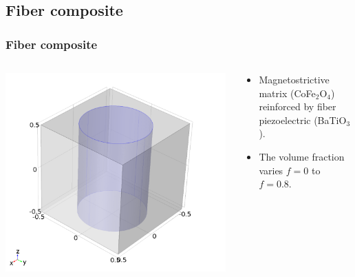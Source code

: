 \documentclass[compress]{beamer}
\begin{document}
\subsection{Fiber composite}
\begin{frame}\frametitle{Fiber composite}
\begin{columns}[totalwidth=\textwidth]
   \begin{column}{.30\textwidth}
   \centering
   \includegraphics[width=0.99\textwidth]{Graphic/04_geocylin.pdf}
   \end{column}
   \begin{column}{.70\textwidth}
   \centering
   \begin{itemize}[label=$\bullet$, font=\small, leftmargin=*]
	\item Magnetostrictive matrix (CoFe$_2$O$_4$) reinforced by fiber piezoelectric (BaTiO$_3$).
	\item The volume fraction varies $f=0$ to $f=0.8$.
	\end{itemize}
   \end{column}
\end{columns}
\end{frame}
\end{document}
